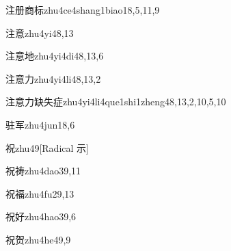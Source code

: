 \begin{verbete}{注册商标}{zhu4ce4shang1biao1}{8,5,11,9}
\end{verbete}

\begin{verbete}{注意}{zhu4yi4}{8,13}
\end{verbete}

\begin{verbete}{注意地}{zhu4yi4di4}{8,13,6}
\end{verbete}

\begin{verbete}{注意力}{zhu4yi4li4}{8,13,2}
\end{verbete}

\begin{verbete}{注意力缺失症}{zhu4yi4li4que1shi1zheng4}{8,13,2,10,5,10}
\end{verbete}

\begin{verbete}{驻军}{zhu4jun1}{8,6}
\end{verbete}

\begin{verbete}{祝}{zhu4}{9}[Radical 示]
\end{verbete}

\begin{verbete}{祝祷}{zhu4dao3}{9,11}
\end{verbete}

\begin{verbete}{祝福}{zhu4fu2}{9,13}
\end{verbete}

\begin{verbete}{祝好}{zhu4hao3}{9,6}
\end{verbete}

\begin{verbete}{祝贺}{zhu4he4}{9,9}
\end{verbete}

